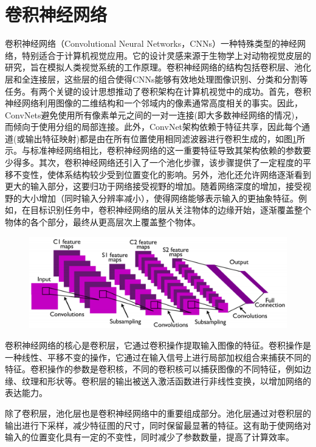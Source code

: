 \section{卷积神经网络}
卷积神经网络（Convolutional Neural Networks，CNNs）一种特殊类型的神经网络，特别适合于计算机视觉应用。它的设计灵感来源于生物学上对动物视觉皮层的研究，旨在模拟人类视觉系统的工作原理。卷积神经网络的结构包括卷积层、池化层和全连接层，这些层的组合使得CNNs能够有效地处理图像识别、分类和分割等任务。有两个关键的设计思想推动了卷积架构在计算机视觉中的成功。首先，卷积神经网络利用图像的二维结构和一个邻域内的像素通常高度相关的事实。因此，ConvNets避免使用所有像素单元之间的一对一连接(即大多数神经网络的情况)，而倾向于使用分组的局部连接。此外，ConvNet架构依赖于特征共享，因此每个通道(或输出特征映射)都是由在所有位置使用相同滤波器进行卷积生成的，如图\ref{fig:conv1}所示。与标准神经网络相比，卷积神经网络的这一重要特征导致其架构依赖的参数要少得多。其次，卷积神经网络还引入了一个池化步骤，该步骤提供了一定程度的平移不变性，使体系结构较少受到位置变化的影响。另外，池化还允许网络逐渐看到更大的输入部分，这要归功于网络接受视野的增加。随着网络深度的增加，接受视野的大小增加（同时输入分辨率减小），使得网络能够表示输入的更抽象特征。例如，在目标识别任务中，卷积神经网络的层从关注物体的边缘开始，逐渐覆盖整个物体的各个部分，最终从更高层次上覆盖整个物体。

\begin{figure}[h]
	\centering 
	\includegraphics[width=12cm]{fig/ch2/conv1.png}
	\label{fig:conv1}
\end{figure}

卷积神经网络的核心是卷积层，它通过卷积操作提取输入图像的特征。卷积操作是一种线性、平移不变的操作，它通过在输入信号上进行局部加权组合来捕获不同的特征。卷积操作的参数是卷积核，不同的卷积核可以捕获图像的不同特征，例如边缘、纹理和形状等。卷积层的输出被送入激活函数进行非线性变换，以增加网络的表达能力。

除了卷积层，池化层也是卷积神经网络中的重要组成部分。池化层通过对卷积层的输出进行下采样，减少特征图的尺寸，同时保留最显著的特征。这有助于使网络对输入的位置变化具有一定的不变性，同时减少了参数数量，提高了计算效率。

